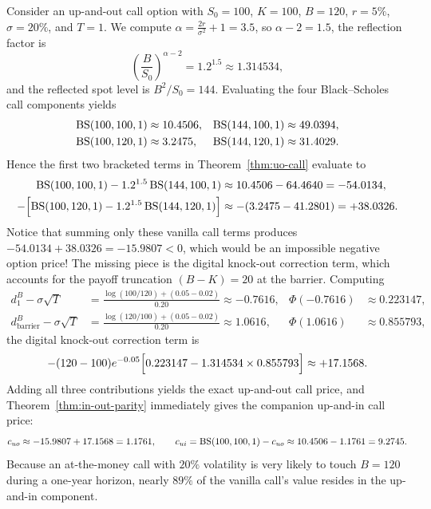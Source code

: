 \begin{example}\label{ex:uo-call-numerical}
    Consider an up-and-out call option with $S_0 = 100$, $K = 100$, $B = 120$, $r = 5\%$, $\sigma = 20\%$, and $T = 1$. We compute $\alpha = \frac{2r}{\sigma^2} + 1 = 3.5$, so $\alpha - 2 = 1.5$, the reflection factor is
    \[
    \left(\frac{B}{S_0}\right)^{\alpha - 2} = 1.2^{1.5} \approx 1.314534,
    \]
    and the reflected spot level is $B^2/S_0 = 144$. Evaluating the four Black--Scholes call components yields
    \[
    \begin{aligned}
        \operatorname{BS}(100, 100, 1) &\approx 10.4506, & \operatorname{BS}(144, 100, 1) &\approx 49.0394, \\
        \operatorname{BS}(100, 120, 1) &\approx 3.2475,  & \operatorname{BS}(144, 120, 1) &\approx 31.4029.
    \end{aligned}
    \]
    Hence the first two bracketed terms in Theorem~\ref{thm:uo-call} evaluate to
    \[
    \begin{aligned}
        \operatorname{BS}(100, 100, 1) - 1.2^{1.5}\operatorname{BS}(144, 100, 1) &\approx 10.4506 - 64.4640 = -54.0134, \\
        -\Bigl[\operatorname{BS}(100, 120, 1) - 1.2^{1.5}\operatorname{BS}(144, 120, 1)\Bigr] &\approx -(3.2475 - 41.2801) = +38.0326.
    \end{aligned}
    \]
    Notice that summing only these vanilla call terms produces $-54.0134 + 38.0326 = -15.9807 < 0$, which would be an impossible negative option price! The missing piece is the digital knock-out correction term, which accounts for the payoff truncation $(B - K) = 20$ at the barrier. Computing
    \[
    \begin{aligned}
        d_1^B - \sigma\sqrt{T} &= \frac{\log(100/120) + (0.05 - 0.02)}{0.20} \approx -0.7616, & \Phi(-0.7616) &\approx 0.223147, \\
        d_{\text{barrier}}^B - \sigma\sqrt{T} &= \frac{\log(120/100) + (0.05 - 0.02)}{0.20} \approx 1.0616, & \Phi(1.0616) &\approx 0.855793,
    \end{aligned}
    \]
    the digital knock-out correction term is
    \[
    -(120 - 100)e^{-0.05}\Bigl[0.223147 - 1.314534 \times 0.855793\Bigr] \approx +17.1568.
    \]
    Adding all three contributions yields the exact up-and-out call price, and Theorem~\ref{thm:in-out-parity} immediately gives the companion up-and-in call price:
    \[
    c_{uo} \approx -15.9807 + 17.1568 = 1.1761, \qquad c_{ui} = \operatorname{BS}(100, 100, 1) - c_{uo} \approx 10.4506 - 1.1761 = 9.2745.
    \]
    Because an at-the-money call with $20\%$ volatility is very likely to touch $B = 120$ during a one-year horizon, nearly $89\%$ of the vanilla call's value resides in the up-and-in component.
\end{example}


